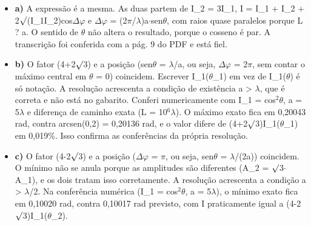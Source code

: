 \documentclass{article}%
\begin{document}
\begin{itemize}%
\item%
\textbf{a)} A expressão é a mesma. As duas partem de I\_2 = 3I\_1, I = I\_1 + I\_2 + 2$\surd$(I\_1I\_2)cos$\Delta$$\varphi$ e $\Delta$$\varphi$ = (2$\pi$/$\lambda$)a$\cdot$sen$\theta$, com raios quase paralelos porque L ? a. O sentido de $\theta$ não altera o resultado, porque o cosseno é par. A transcrição foi conferida com a pág. 9 do PDF e está fiel.%
\item%
\textbf{b)} O fator (4+2$\surd$3) e a posição (sen$\theta$ = $\lambda$/a, ou seja, $\Delta$$\varphi$ = 2$\pi$, sem contar o máximo central em $\theta$ = 0) coincidem. Escrever I\_1($\theta$\_1) em vez de I\_1($\theta$) é só notação. A resolução acrescenta a condição de existência a > $\lambda$, que é correta e não está no gabarito. Conferi numericamente com I\_1 = cos$^2$$\theta$, a = 5$\lambda$ e diferença de caminho exata (L = 10$^{6}$$\lambda$). O máximo exato fica em 0,20043 rad, contra arcsen(0,2) = 0,20136 rad, e o valor difere de (4+2$\surd$3)I\_1($\theta$\_1) em 0,019\%. Isso confirma as conferências da própria resolução.%
\item%
\textbf{c)} O fator (4-2$\surd$3) e a posição ($\Delta$$\varphi$ = $\pi$, ou seja, sen$\theta$ = $\lambda$/(2a)) coincidem. O mínimo não se anula porque as amplitudes são diferentes (A\_2 = $\surd$3$\cdot$A\_1), e os dois tratam isso corretamente. A resolução acrescenta a condição a > $\lambda$/2. Na conferência numérica (I\_1 = cos$^2$$\theta$, a = 5$\lambda$), o mínimo exato fica em 0,10020 rad, contra 0,10017 rad previsto, com I praticamente igual a (4-2$\surd$3)I\_1($\theta$\_2).%
\end{itemize}%
\end{document}
